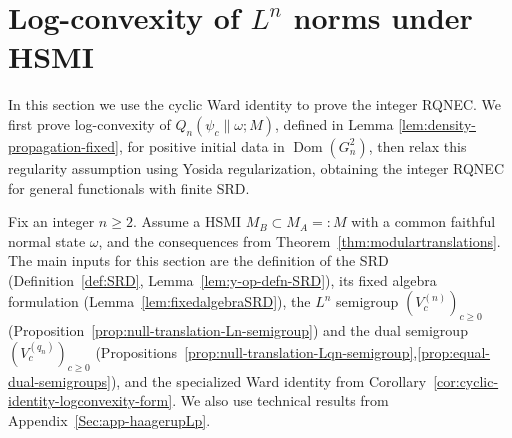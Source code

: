 \documentclass[11pt,a4paper]{article}
\theoremstyle{plain}
\numberwithin{theorem}{section}
\theoremstyle{definition}
\newcommand{\?}{\overset{?}{=}}
\DeclareMathOperator{\Dom}{Dom}
\begin{document}
\section{Log-convexity of \texorpdfstring{$L^n$}{Ln} norms under HSMI}\label{sec:integer-renyi-qnec}

In this section we use the cyclic Ward identity to prove the integer RQNEC. We first prove log-convexity of $Q_n(\psi_c\|\omega;M)$, defined in Lemma \ref{lem:density-propagation-fixed}, for positive initial data in $\Dom(G_n^2)$, then relax this regularity assumption using Yosida regularization, obtaining the integer RQNEC for general functionals with finite SRD.  

Fix an integer $n\geq2$. Assume a HSMI $M_B\subset M_A=:M$ with a common faithful normal state $\omega$, and the consequences from Theorem~\ref{thm:modulartranslations}.
The main inputs for this section are the definition of the SRD (Definition~\ref{def:SRD}, Lemma~\ref{lem:y-op-defn-SRD}), its fixed algebra formulation (Lemma~\ref{lem:fixedalgebraSRD}), the $L^n$ semigroup $(V_c^{(n)})_{c\geq0}$ (Proposition~\ref{prop:null-translation-Ln-semigroup}) and the dual semigroup $(V_c^{(q_n)})_{c\geq0}$ (Propositions~\ref{prop:null-translation-Lqn-semigroup},\ref{prop:equal-dual-semigroups}), and the specialized Ward identity from Corollary~\ref{cor:cyclic-identity-logconvexity-form}. We also use technical results from Appendix~\ref{Sec:app-haagerupLp}.
\end{document}
